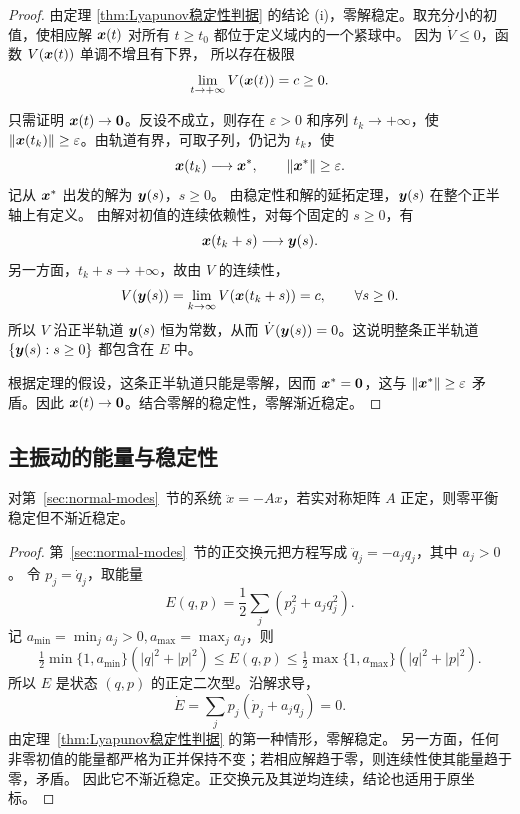 \begin{proof}
	由定理 \ref{thm:Lyapunov稳定性判据} 的结论
	\textnormal{(i)}，零解稳定。取充分小的初值，使相应解
	$\boldsymbol{x}(t)$ 对所有 $t\geq t_0$ 都位于定义域内的一个紧球中。
	因为 $\dot V\leq0$，函数 $V(\boldsymbol{x}(t))$ 单调不增且有下界，
	所以存在极限
	\[
		\lim_{t\to+\infty}V(\boldsymbol{x}(t))=c\geq0.
	\]

	只需证明 $\boldsymbol{x}(t)\to\boldsymbol{0}$。反设不成立，则存在
	$\varepsilon>0$ 和序列 $t_k\to+\infty$，使
	$\left\| \boldsymbol{x}(t_k) \right\|\geq\varepsilon$。由轨道有界，可取子列，仍记为
	$t_k$，使
	\[
		\boldsymbol{x}(t_k)\longrightarrow\boldsymbol{x}^{*},
		\qquad \left\| \boldsymbol{x}^{*} \right\|\geq\varepsilon.
	\]
	记从 $\boldsymbol{x}^{*}$ 出发的解为 $\boldsymbol{y}(s)$，$s\geq0$。
	由稳定性和解的延拓定理，$\boldsymbol{y}(s)$ 在整个正半轴上有定义。
	由解对初值的连续依赖性，对每个固定的 $s\geq0$，有
	\[
		\boldsymbol{x}(t_k+s)\longrightarrow\boldsymbol{y}(s).
	\]
	另一方面，$t_k+s\to+\infty$，故由 $V$ 的连续性，
	\[
		V(\boldsymbol{y}(s))
		=\lim_{k\to\infty}V(\boldsymbol{x}(t_k+s))
		=c,
		\qquad \forall s\geq0.
	\]
	所以 $V$ 沿正半轨道 $\boldsymbol{y}(s)$ 恒为常数，从而
	$\dot V(\boldsymbol{y}(s))=0$。这说明整条正半轨道
	$\{\boldsymbol{y}(s):s\geq0\}$ 都包含在 $E$ 中。

	根据定理的假设，这条正半轨道只能是零解，因而
	$\boldsymbol{x}^{*}=\boldsymbol{0}$，这与
	$\left\| \boldsymbol{x}^{*} \right\|\geq\varepsilon$ 矛盾。因此
	$\boldsymbol{x}(t)\to\boldsymbol{0}$。结合零解的稳定性，零解渐近稳定。
\end{proof}

\subsection*{主振动的能量与稳定性}
\begin{proposition}\label{prop:normal-mode-stability}
对第~\ref{sec:normal-modes}~节的系统 $\ddot x=-Ax$，若实对称矩阵 $A$ 正定，则零平衡稳定但不渐近稳定。
\end{proposition}
\begin{proof}
第~\ref{sec:normal-modes}~节的正交换元把方程写成 $\ddot q_j=-a_jq_j$，其中 $a_j>0$。
令 $p_j=\dot q_j$，取能量
\[
 E(q,p)=\frac12\sum_j(p_j^2+a_jq_j^2).
\]
记 $a_{\min}=\min_ja_j>0,a_{\max}=\max_ja_j$，则
\[
 \tfrac12\min\{1,a_{\min}\}(|q|^2+|p|^2)
 \leq E(q,p)
 \leq\tfrac12\max\{1,a_{\max}\}(|q|^2+|p|^2).
\]
所以 $E$ 是状态 $(q,p)$ 的正定二次型。沿解求导，
\[
 \dot E=\sum_jp_j(\dot p_j+a_jq_j)=0.
\]
由定理~\ref{thm:Lyapunov稳定性判据} 的第一种情形，零解稳定。
另一方面，任何非零初值的能量都严格为正并保持不变；若相应解趋于零，则连续性使其能量趋于零，矛盾。
因此它不渐近稳定。正交换元及其逆均连续，结论也适用于原坐标。
\end{proof}

